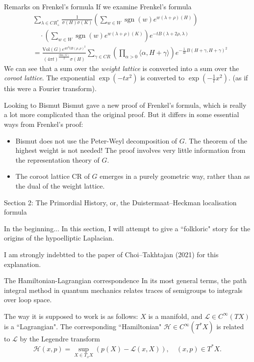 \documentclass{beamer}
\numberwithin{equation}{section}
\theoremstyle{plain}
\theoremstyle{plain}
\theoremstyle{definition}
\theoremstyle{plain}
\theoremstyle{plain}
\theoremstyle{definition}
\newcommand{\Hc}{\mathcal{H}}
\newcommand{\Lc}{\mathcal{L}}
\newcommand{\sgn}{\operatorname{sgn}}
\newcommand{\CR}{\mathrm{CR}}
\begin{document}
\begin{frame}{Remarks on Frenkel's formula}
If we examine Frenkel's formula
\begin{align*}
 &\sum_{\lambda \in CR^*_+} \frac{1}{\sigma(H)\sigma(K)}\left(\sum_{w \in W} \sgn(w)e^{w(\lambda+\rho)(H)}\right)\\
      &\quad \cdot \left(\sum_{w\in W} \sgn(w)e^{w(\lambda+\rho)(K)}\right)e^{-tB(\lambda+2\rho,\lambda)}\\
      &=\frac{\mathrm{Vol}(G)e^{4\pi^2tB(\rho,\rho)^2}}{(4\pi t)^{\frac{\mathrm{dim}(G)}{2}}\sigma(H)}\sum_{\gamma \in CR} \left(\prod_{\alpha>0} \langle \alpha,H+\gamma\rangle\right) e^{-\frac{1}{4t}B(H+\gamma,H+\gamma)^2}
\end{align*}
We can see that a sum over the \emph{weight lattice} is converted into a sum over the \emph{coroot lattice}. The exponential $\exp(-tx^2)$ is converted to $\exp(-\frac{1}{t}x^2).$ (as if this were a Fourier transform).
\end{frame}

\begin{frame}{Looking to Bismut}
Bismut gave a new proof of Frenkel's formula, which is really a lot more complicated than the original proof. But it differs in some essential ways from Frenkel's proof:
\begin{itemize}
  \item{} Bismut does not use the Peter-Weyl decomposition of $G.$ The theorem of the highest weight is not needed! The proof involves very little information from the representation theory of $G.$
  \item{} The coroot lattice $\CR$ of $G$ emerges in a purely geometric way, rather than as the dual of the weight lattice.
\end{itemize}
\end{frame}


\begin{frame}
    \huge{Section 2: The Primordial History, or, the Duistermaat--Heckman localisation formula}
\end{frame}

\begin{frame}{In the beginning...}
  In this section, I will attempt to give a ``folkloric" story for the origins of the hypoelliptic Laplacian.
  
  I am strongly indebtted to the paper of Choi--Takhtajan (2021) for this explanation.
\end{frame}

\begin{frame}{The Hamiltonian-Lagrangian correspondence}
  In its most general terms, the path integral method in quantum mechanics relates traces of semigroups
  to integrals over loop space. 
  
  The way it is supposed to work is as follows: $X$ is a manifold, and $\Lc \in C^\infty(TX)$ is a ``Lagrangian". The corresponding
  ``Hamiltonian" $\Hc\in C^\infty(T^*X)$ is related to $\Lc$ by the Legendre transform 
  \[
    \Hc(x,p) = \sup_{X \in T_xX} (p(X)-\Lc(x,X)),\quad (x,p) \in T^*X.
  \]
\end{frame}
\end{document}

